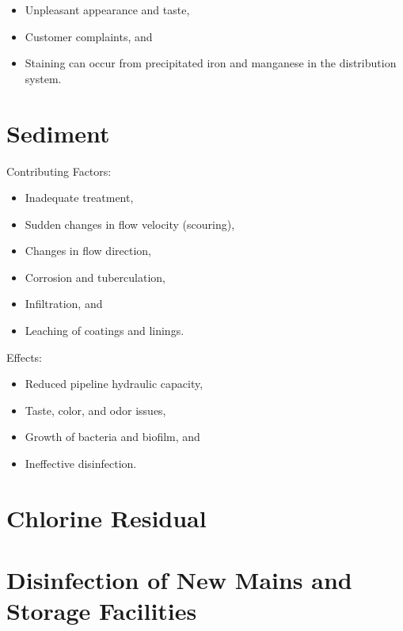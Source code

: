 \documentclass[10pt]{article}
\begin{document}
\begin{itemize}
  \item Unpleasant appearance and taste,

  \item Customer complaints, and

  \item Staining can occur from precipitated iron and manganese in the distribution system.

\end{itemize}
\section{Sediment}
Contributing Factors:

\begin{itemize}
  \item Inadequate treatment,

  \item Sudden changes in flow velocity (scouring),

  \item Changes in flow direction,

  \item Corrosion and tuberculation,

  \item Infiltration, and

  \item Leaching of coatings and linings.

\end{itemize}
Effects:

\begin{itemize}
  \item Reduced pipeline hydraulic capacity,

  \item Taste, color, and odor issues,

  \item Growth of bacteria and biofilm, and

  \item Ineffective disinfection.

\end{itemize}
\section{Chlorine Residual}
\section{Disinfection of New Mains and Storage Facilities}
\end{document}
